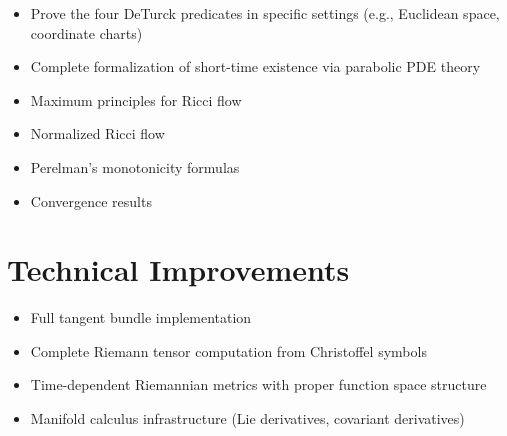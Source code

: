 \begin{itemize}
\item Prove the four DeTurck predicates in specific settings (e.g., Euclidean space, coordinate charts)
\item Complete formalization of short-time existence via parabolic PDE theory
\item Maximum principles for Ricci flow
\item Normalized Ricci flow
\item Perelman's monotonicity formulas
\item Convergence results
\end{itemize}

\section{Technical Improvements}

\begin{itemize}
\item Full tangent bundle implementation
\item Complete Riemann tensor computation from Christoffel symbols
\item Time-dependent Riemannian metrics with proper function space structure
\item Manifold calculus infrastructure (Lie derivatives, covariant derivatives)
\end{itemize}
